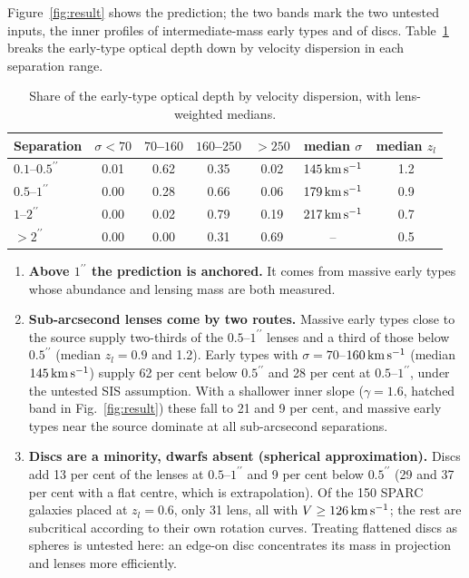 \documentclass[11pt,a4paper]{article}
\newcommand{\arcsecond}{^{\prime\prime}}
\newcommand{\kms}{\,{\rm km\,s^{-1}}}
\begin{document}
Figure~\ref{fig:result} shows the prediction; the two bands mark the two untested inputs, the inner profiles of intermediate-mass early types and of discs. Table~\ref{tab:sigma} breaks the early-type optical depth down by velocity dispersion in each separation range.

\begin{table}[h]
\centering
\caption{Share of the early-type optical depth by velocity dispersion, with lens-weighted medians.}
\label{tab:sigma}
\begin{tabular}{lcccccc}
\toprule
Separation & $\sigma<70$ & $70$--$160$ & $160$--$250$ & $>250$ & median $\sigma$ & median $z_l$ \\
\midrule
$0.1$--$0.5\arcsecond$ & 0.01 & 0.62 & 0.35 & 0.02 & $145\kms$ & 1.2 \\
$0.5$--$1\arcsecond$ & 0.00 & 0.28 & 0.66 & 0.06 & $179\kms$ & 0.9 \\
$1$--$2\arcsecond$ & 0.00 & 0.02 & 0.79 & 0.19 & $217\kms$ & 0.7 \\
$>2\arcsecond$ & 0.00 & 0.00 & 0.31 & 0.69 & -- & 0.5 \\
\bottomrule
\end{tabular}
\end{table}

\begin{enumerate}
\item \textbf{Above $1\arcsecond$ the prediction is anchored.} It comes from massive early types whose abundance and lensing mass are both measured.
\item \textbf{Sub-arcsecond lenses come by two routes.} Massive early types close to the source supply two-thirds of the $0.5$--$1\arcsecond$ lenses and a third of those below $0.5\arcsecond$ (median $z_l=0.9$ and 1.2). Early types with $\sigma=70$--$160\kms$ (median $145\kms$) supply 62 per cent below $0.5\arcsecond$ and 28 per cent at $0.5$--$1\arcsecond$, under the untested SIS assumption. With a shallower inner slope ($\gamma=1.6$, hatched band in Fig.~\ref{fig:result}) these fall to 21 and 9 per cent, and massive early types near the source dominate at all sub-arcsecond separations.
\item \textbf{Discs are a minority, dwarfs absent (spherical approximation).} Discs add 13 per cent of the lenses at $0.5$--$1\arcsecond$ and 9 per cent below $0.5\arcsecond$ (29 and 37 per cent with a flat centre, which is extrapolation). Of the 150 SPARC galaxies placed at $z_l=0.6$, only 31 lens, all with $V\geq126\kms$; the rest are subcritical according to their own rotation curves. Treating flattened discs as spheres is untested here: an edge-on disc concentrates its mass in projection and lenses more efficiently.
\end{enumerate}
\end{document}

